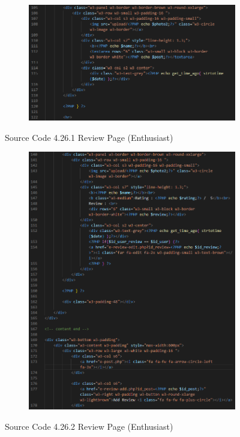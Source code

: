 \begin{enumerate}[1.]
\begin{figure}[h]
\begin{subfigure}[b]{0.6\textwidth}
            \centering
            \includegraphics[width=\textwidth]{mainmatter/images/frontend/code/ereview2.png}
            \label{fig:sub2}
        \end{subfigure}
        \caption*{Source Code 4.26.1 Review Page (Enthusiast)}
        \label{fig:myfig65a}
    \end{figure}
    \begin{figure}[h]\ContinuedFloat
        \centering
        \begin{subfigure}[b]{0.7\textwidth}
            \centering
            \includegraphics[width=\textwidth]{mainmatter/images/frontend/code/ereview3.png}
            \label{fig:sub3}
        \end{subfigure}
        \caption*{Source Code 4.26.2 Review Page (Enthusiast)}
        \label{fig:myfig65b}
    \end{figure}


\end{enumerate}
